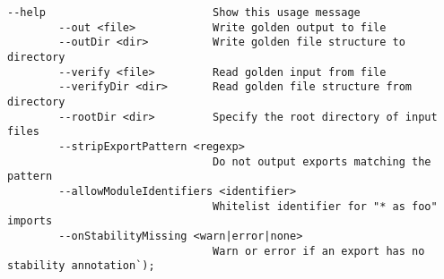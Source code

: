 \begin{verbatim}
--help                          Show this usage message
        --out <file>            Write golden output to file
        --outDir <dir>          Write golden file structure to directory
        --verify <file>         Read golden input from file
        --verifyDir <dir>       Read golden file structure from directory
        --rootDir <dir>         Specify the root directory of input files
        --stripExportPattern <regexp>
                                Do not output exports matching the pattern
        --allowModuleIdentifiers <identifier>
                                Whitelist identifier for "* as foo" imports
        --onStabilityMissing <warn|error|none>
                                Warn or error if an export has no stability annotation`);
\end{verbatim}
